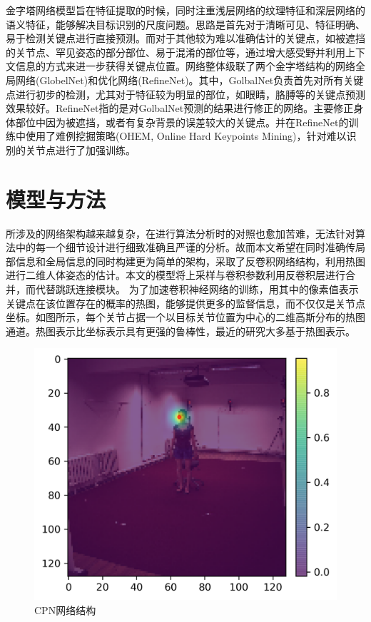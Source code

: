 金字塔网络模型旨在特征提取的时候，同时注重浅层网络的纹理特征和深层网络的语义特征，能够解决目标识别的尺度问题。思路是首先对于清晰可见、特征明确、易于检测关键点进行直接预测。而对于其他较为难以准确估计的关键点，如被遮挡的关节点、罕见姿态的部分部位、易于混淆的部位等，通过增大感受野并利用上下文信息的方式来进一步获得关键点位置。网络整体级联了两个金字塔结构的网络全局网络(GlobelNet)和优化网络(RefineNet)。其中，GolbalNet负责首先对所有关键点进行初步的检测，尤其对于特征较为明显的部位，如眼睛，胳膊等的关键点预测效果较好。RefineNet指的是对GolbalNet预测的结果进行修正的网络。主要修正身体部位中因为被遮挡，或者有复杂背景的误差较大的关键点。并在RefineNet的训练中使用了难例挖掘策略(OHEM, Online Hard Keypoints Mining)，针对难以识别的关节点进行了加强训练。


\section{模型与方法}
所涉及的网络架构越来越复杂，在进行算法分析时的对照也愈加苦难，无法针对算法中的每一个细节设计进行细致准确且严谨的分析。故而本文希望在同时准确传局部信息和全局信息的同时构建更为简单的架构，采取了反卷积网络结构，利用热图进行二维人体姿态的估计。本文的模型将上采样与卷积参数利用反卷积层进行合并，而代替跳跃连接模块。
为了加速卷积神经网络的训练，用其中的像素值表示关键点在该位置存在的概率的热图，能够提供更多的监督信息，而不仅仅是关节点坐标。如图所示，每个关节占据一个以目标关节位置为中心的二维高斯分布的热图通道。热图表示比坐标表示具有更强的鲁棒性，最近的研究大多基于热图表示。
\begin{figure}[h]
	\centering
	\includegraphics[scale=0.4]{figures/18.png}
	\caption{CPN网络结构}
	\label{fig:f18}
\end{figure}
